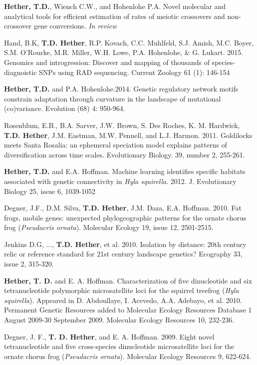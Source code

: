 \documentclass[letterpaper]{article}
\renewenvironment{itemize}{
  \begin{list}{}{
    \setlength{\leftmargin}{1.5em}
  }
}{
  \end{list}
}
\begin{document}
\begin{itemize}
\item \textbf{Hether, T.D.}, Wiench C.W., and Hohenlohe P.A. Novel molecular and analytical tools for efficient estimation of rates of meiotic crossovers and non-crossover gene conversions. \textit{In review}
\item Hand, B.K, \textbf{T.D. Hether}, R.P. Kovach, C.C. Muhlfeld, S.J. Amish, M.C. Boyer, S.M. O'Rourke, M.R. Miller, W.H. Lowe, P.A. Hohenlohe, \& G. Lukart. 2015. Genomics and introgression: Discover and mapping of thousands of species-diagnoistic SNPs using RAD sequencing.  Current Zoology 61 (1): 146-154
\item \textbf{Hether, T.D.} and P.A. Hohenlohe.2014. Genetic regulatory network motifs constrain adaptation through curvature in the landscape of mutational (co)variance. Evolution (68) 4: 950-964.
\item Rosenblum, E.B., B.A. Sarver, J.W. Brown, S. Des Roches, K. M. Hardwick, \textbf{T.D. Hether}, J.M. Eastman, M.W. Pennell, and L.J. Harmon. 2011. Goldilocks meets Santa Rosalia: an ephemeral speciation model explains patterns of diversification across time scales. Evolutionary Biology. 39, number 2, 255-261.
\item \textbf{Hether, T.D.} and E.A. Hoffman. Machine learning identifies specific habitats associated with genetic connectivity in \emph{Hyla squirella}. 2012. J. Evolutionary Biology 25, issue 6, 1039-1052 
\item Degner, J.F., D.M. Silva, \textbf{T.D. Hether}, J.M. Daza, E.A. Hoffman. 2010. Fat frogs, mobile genes: unexpected phylogeographic patterns for the ornate chorus frog (\emph{Pseudacris ornata}). Molecular Ecology 19, issue 12, 2501-2515.
\item Jenkins D.G, ..., \textbf{T.D. Hether}, et al. 2010. Isolation by distance: 20th century relic or reference standard for 21st century landscape genetics?  Ecography 33, issue 2, 315-320.
\item \textbf{Hether, T. D.} and E. A. Hoffman. Characterization of five dinucleotide and six tetranucleotide polymorphic microsatellite loci for the squirrel treefrog (\emph{Hyla squirella}).  Appeared in D. Abdoullaye, I. Acevedo, A.A. Adebayo, et al. 2010. Permanent Genetic Resources added to Molecular Ecology Resources Database 1 August 2009-30 September 2009. Molecular Ecology Resources 10, 232-236.
\item Degner, J. F., \textbf{T. D. Hether}, and E. A. Hoffman. 2009. Eight novel tetranucleotide and five cross-species dinucleotide microsatellite loci for the ornate chorus frog (\emph{Pseudacris ornata}). Molecular Ecology Resources 9, 622-624.

\end{itemize}
\end{document}
